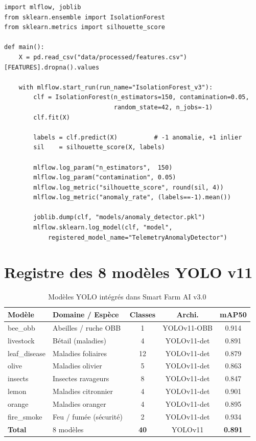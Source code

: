 \documentclass[12pt,a4paper,oneside]{report}
\begin{document}
\begin{lstlisting}[style=pythonstyle,caption={train\_anomaly.py — Stage 2 DVC avec MLflow},label={lst:train}]
import mlflow, joblib
from sklearn.ensemble import IsolationForest
from sklearn.metrics import silhouette_score

def main():
    X = pd.read_csv("data/processed/features.csv")[FEATURES].dropna().values

    with mlflow.start_run(run_name="IsolationForest_v3"):
        clf = IsolationForest(n_estimators=150, contamination=0.05,
                              random_state=42, n_jobs=-1)
        clf.fit(X)

        labels = clf.predict(X)          # -1 anomalie, +1 inlier
        sil    = silhouette_score(X, labels)

        mlflow.log_param("n_estimators",  150)
        mlflow.log_param("contamination", 0.05)
        mlflow.log_metric("silhouette_score", round(sil, 4))
        mlflow.log_metric("anomaly_rate", (labels==-1).mean())

        joblib.dump(clf, "models/anomaly_detector.pkl")
        mlflow.sklearn.log_model(clf, "model",
            registered_model_name="TelemetryAnomalyDetector")
\end{lstlisting}

\section{Registre des 8 modèles YOLO v11}

\begin{table}[H]\centering
\caption{Modèles YOLO intégrés dans Smart Farm AI v3.0}
\label{tab:yolo}
\small
\begin{tabular}{llccc}
\toprule
\textbf{Modèle}&\textbf{Domaine / Espèce}&\textbf{Classes}&\textbf{Archi.}&\textbf{mAP50}\\
\midrule
bee\_obb       & Abeilles / ruche OBB    & 1  & YOLOv11-OBB & 0.914\\
livestock      & Bétail (maladies)       & 4  & YOLOv11-det & 0.891\\
leaf\_disease  & Maladies foliaires      & 12 & YOLOv11-det & 0.879\\
olive          & Maladies olivier        & 5  & YOLOv11-det & 0.863\\
insects        & Insectes ravageurs      & 8  & YOLOv11-det & 0.847\\
lemon          & Maladies citronnier     & 4  & YOLOv11-det & 0.901\\
orange         & Maladies oranger        & 4  & YOLOv11-det & 0.895\\
fire\_smoke    & Feu / fumée (sécurité)  & 2  & YOLOv11-det & 0.934\\
\midrule
\textbf{Total} & 8 modèles               &\textbf{40}&YOLOv11&\textbf{0.891}\\
\bottomrule
\end{tabular}
\end{table}
\end{document}
